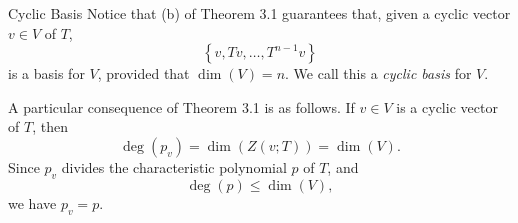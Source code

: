 \documentclass[linearalgebraII]{subfiles}
\begin{document}
    \begin{definition}{Cyclic Basis}{}
        Notice that (b) of Theorem 3.1 guarantees that, given a cyclic vector $v\in V$ of $T$,
        \begin{equation*}
            \left\lbrace v, Tv, \ldots, T^{n-1}v \right\rbrace 
        \end{equation*}
        is a basis for $V$, provided that $\dim(V)=n$. We call this a \emph{cyclic basis} for $V$.
    \end{definition}

    \begin{remark}
        A particular consequence of Theorem 3.1 is as follows. If $v\in V$ is a cyclic vector of $T$, then
        \begin{equation*}
            \deg(p_v) = \dim \left( Z(v;T) \right) = \dim(V).
        \end{equation*}
        Since $p_v$ divides the characteristic polynomial $p$ of $T$, and
        \begin{equation*}
            \deg(p)\leq\dim(V),
        \end{equation*}
        we have $p_v=p$.
    \end{remark}
\end{document}
